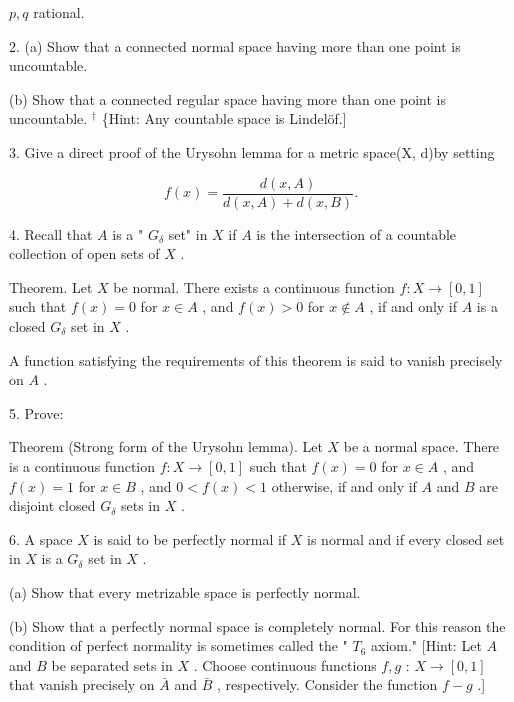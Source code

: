 \(p,q\) rational.

2. (a) Show that a connected normal space having more than one point is uncountable.

(b) Show that a connected regular space having more than one point is uncountable. \({}^{ \dagger  }\) \{Hint: Any countable space is Lindelöf.]

3. Give a direct proof of the Urysohn lemma for a metric space(X, d)by setting

\[
f\left( x\right)  = \frac{d\left( {x,A}\right) }{d\left( {x,A}\right)  + d\left( {x,B}\right) }.
\]


4. Recall that \(A\) is a " \({G}_{\delta }\) set" in \(X\) if \(A\) is the intersection of a countable collection of open sets of \(X\) .

Theorem. Let \(X\) be normal. There exists a continuous function \(f : X \rightarrow  \left\lbrack  {0,1}\right\rbrack\) such that \(f\left( x\right)  = 0\) for \(x \in  A\) , and \(f\left( x\right)  > 0\) for \(x \notin  A\) , if and only if \(A\) is a closed \({G}_{\delta }\) set in \(X\) .

A function satisfying the requirements of this theorem is said to vanish precisely on \(A\) .

5. Prove:

Theorem (Strong form of the Urysohn lemma). Let \(X\) be a normal space. There is a continuous function \(f : X \rightarrow  \left\lbrack  {0,1}\right\rbrack\) such that \(f\left( x\right)  = 0\) for \(x \in  A\) , and \(f\left( x\right)  = 1\) for \(x \in  B\) , and \(0 < f\left( x\right)  < 1\) otherwise, if and only if \(A\) and \(B\) are disjoint closed \({G}_{\delta }\) sets in \(X\) .

6. A space \(X\) is said to be perfectly normal if \(X\) is normal and if every closed set in \(X\) is a \({G}_{\delta }\) set in \(X\) .

(a) Show that every metrizable space is perfectly normal.

(b) Show that a perfectly normal space is completely normal. For this reason the condition of perfect normality is sometimes called the " \({T}_{6}\) axiom." [Hint: Let \(A\) and \(B\) be separated sets in \(X\) . Choose continuous functions \(f,g\) : \(X \rightarrow  \left\lbrack  {0,1}\right\rbrack\) that vanish precisely on \(\bar{A}\) and \(\bar{B}\) , respectively. Consider the function \(f - g\) .]

